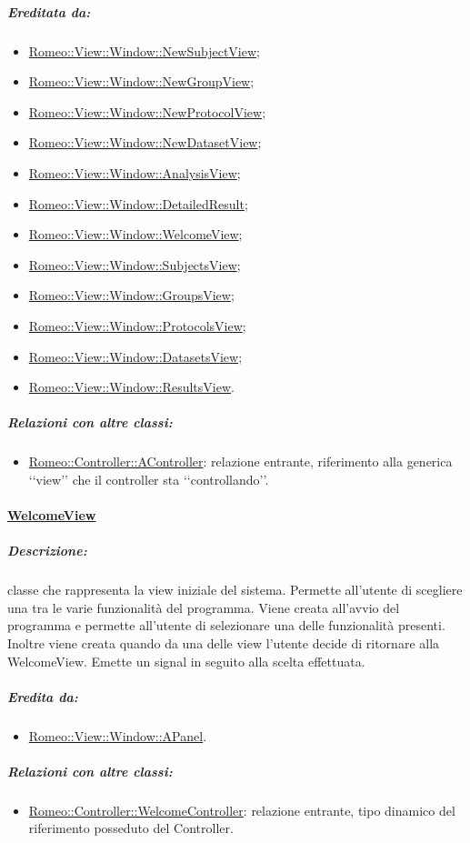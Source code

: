 			\subparagraph{Ereditata da:}
			\begin{itemize}
				\item \hyperref[nsv]{Romeo::View::Window::NewSubjectView};
				\item \hyperref[ngv]{Romeo::View::Window::NewGroupView};
				\item \hyperref[npv]{Romeo::View::Window::NewProtocolView};
				\item \hyperref[ndv]{Romeo::View::Window::NewDatasetView};
				\item \hyperref[sav]{Romeo::View::Window::AnalysisView};
				\item \hyperref[drv]{Romeo::View::Window::DetailedResult};
				\item \hyperref[wv]{Romeo::View::Window::WelcomeView};
				\item \hyperref[vsv]{Romeo::View::Window::SubjectsView};
				\item \hyperref[vgv]{Romeo::View::Window::GroupsView};
				\item \hyperref[vpv]{Romeo::View::Window::ProtocolsView};
				\item \hyperref[vdv]{Romeo::View::Window::DatasetsView};
				\item \hyperref[vrv]{Romeo::View::Window::ResultsView}.
			\end{itemize}
			\subparagraph{Relazioni con altre classi:}
				\begin{itemize}
					\item  \hyperref[controller_a]{Romeo::Controller::AController}: relazione entrante, riferimento alla generica \lq\lq{}view\rq\rq{} che il controller sta \lq\lq{}controllando\rq\rq{}.
				\end{itemize}
		
		
		\paragraph{\underline{WelcomeView}}
		\label{wv} 
			\subparagraph{Descrizione:} classe che rappresenta la view iniziale del sistema. Permette all'utente di scegliere una tra le varie funzionalità del programma. 
			Viene creata all'avvio del programma e permette all'utente di selezionare una delle funzionalità presenti.
			\\Inoltre viene creata quando da una delle view l'utente decide di ritornare alla WelcomeView.
			Emette un signal\g{} in seguito alla scelta effettuata.
			\subparagraph{Eredita da:} 
				\begin{itemize}
					\item \hyperref[ab_panel]{Romeo::View::Window::APanel}.
				\end{itemize}
			\subparagraph{Relazioni con altre classi:}
				\begin{itemize}
					\item \hyperref[controller_wp]{Romeo::Controller::WelcomeController}: relazione entrante, tipo dinamico del riferimento posseduto del Controller. 
				\end{itemize}
				
